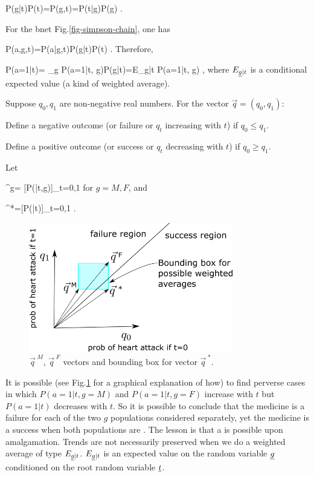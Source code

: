 \beq
P(g|t)P(t)=P(g,t)=P(t|g)P(g)
\;.
\eeq

For the bnet
Fig.\ref{fig-simpson-chain}, 
one has

\beq
P(a,g,t)=P(a|g,t)P(g|t)P(t)
\;.
\eeq
Therefore,

\beq
P(a=1|t)=
\sum_g P(a=1|t, g)P(g|t)=E_{\ul{g}|t}
P(a=1|t, \ul{g})
\;,
\eeq
where $ E_{\ul{g}|t}$ is 
a conditional expected value
 (a kind of weighted average).

Suppose $ q_0, q_1$ are 
non-negative real numbers. 
For the vector $ \vec{q}=(q_0, q_1)$:

Define a negative outcome 
(or failure or $ q_t$ 
increasing with $ t$) 
if $ q_0 \leq q_1$.

Define a positive outcome 
(or success or $ q_t$ 
decreasing with $ t$)
 if $ q_0 \geq q_1$.

Let

\beq
{}^{\;g}=
[P(|t,g)]_{t=0,1}
\;
\eeq
for $g=M,F$, and

\beq
{}^{\;*}=[P(|t)]_{t=0,1}
\;.
\eeq

\begin{figure}[h!]
\centering
\includegraphics[width=3.5in]
{simpson/q-vecs.png}
\caption{$\vec{q}^{\;M}$,
$\vec{q}^{\;F}$ vectors
and bounding box for vector $\vec{q}^{\;*}$.  } 
\label{fig-simpson-q-vecs}
\end{figure}

It is possible (see Fig.\ref{fig-simpson-q-vecs} 
for a graphical explanation of how)
 to find perverse cases in which
 $ P(a=1|t, g=M)$ and $ P(a=1|t, g=F)$
 increase with $ t$ but $ P(a=1|t)$ 
decreases with $ t$. So it is possible 
to conclude that the medicine is a failure
 for each of the two $ g$ populations 
considered separately, yet the medicine 
is a success when both populations are 
. The lesson is that a
  is possible
upon amalgamation. Trends
are not necessarily preserved 
when we do a weighted average of
 type $ E_{\ul{g}|t}$. 
$ E_{\ul{g}|t}$ is an expected value
 on the random variable $ \ul{g}$
 conditioned on the root 
random variable $ \ul{t}$.

